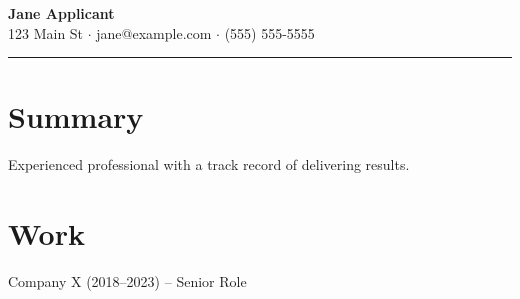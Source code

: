 \documentclass[11pt]{article}
\begin{document}
\begin{center}
  {\Large \textbf{Jane Applicant}}\\
  123 Main St $\cdot$ jane@example.com $\cdot$ (555) 555-5555
\end{center}
\vspace{3mm}
\noindent\rule{\textwidth}{0.4pt}
\section*{Summary}
Experienced professional with a track record of delivering results.
\section*{Work}
Company X (2018--2023) -- Senior Role
\end{document}
